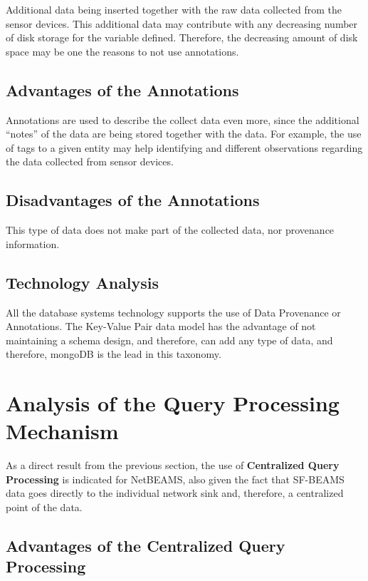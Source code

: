 Additional data being inserted together with the raw data collected from the
sensor devices. This additional data may contribute with any decreasing number
of disk storage for the variable defined. Therefore, the decreasing amount
of disk space may be one the reasons to not use annotations.

\subsection{Advantages of the Annotations}

Annotations are used to describe the collect data even more, since the
additional ``notes'' of the data are being stored together with the data. For
example, the use of tags to a given entity may help identifying and different
observations regarding the data collected from sensor devices.

\subsection{Disadvantages of the Annotations}

This type of data does not make part of the collected data, nor provenance
information. 

\subsection{Technology Analysis}

All the database systems technology supports the use of Data Provenance or
Annotations. The Key-Value Pair data model has the advantage of not maintaining
a schema design, and therefore, can add any type of data, and therefore,
mongoDB is the lead in this taxonomy.

\section{Analysis of the Query Processing Mechanism}

As a direct result from the previous section, the use of \textbf{Centralized Query
Processing} is indicated for NetBEAMS, also given the fact that SF-BEAMS data
goes directly to the individual network sink and, therefore, a centralized
point of the data.

\subsection{Advantages of the Centralized Query Processing}


